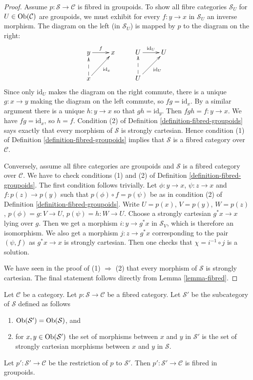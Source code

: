 \begin{proof}
Assume $p : \mathcal{S} \to \mathcal{C}$ is fibred in groupoids.
To show all fibre categories $\mathcal{S}_U$ for
$U \in \mathop{\mathrm{Ob}}\nolimits(\mathcal{C})$
are groupoids, we must exhibit for every $f : y \to x$ in $\mathcal{S}_U$ an
inverse morphism. The diagram on the left (in $\mathcal{S}_U$) is mapped by
$p$ to the diagram on the right:
$$
\xymatrix{
y \ar[r]^f & x & U \ar[r]^{\text{id}_U} & U \\
x \ar@{-->}[u] \ar[ru]_{\text{id}_x} & &
U \ar@{-->}[u]\ar[ru]_{\text{id}_U} & \\
}
$$
Since only $\text{id}_U$ makes the diagram on the right commute, there is a
unique $g : x \to y$ making the diagram on the left commute, so
$fg = \text{id}_x$. By a similar argument there is a unique $h : y \to x$ so
that $gh = \text{id}_y$. Then $fgh = f : y \to x$. We have $fg = \text{id}_x$,
so $h = f$. Condition (2) of Definition \ref{definition-fibred-groupoids} says
exactly that every morphism of $\mathcal{S}$ is strongly cartesian. Hence
condition (1) of Definition \ref{definition-fibred-groupoids} implies that
$\mathcal{S}$ is a fibred category over $\mathcal{C}$.

\medskip\noindent
Conversely, assume all fibre categories are groupoids and
$\mathcal{S}$ is a fibred category over $\mathcal{C}$.
We have to check conditions (1) and (2) of
Definition \ref{definition-fibred-groupoids}.
The first condition follows trivially. Let $\phi : y \to x$,
$\psi : z \to x$ and $f : p(z) \to p(y)$ such that
$p(\phi) \circ f = p(\psi)$ be as in condition (2) of
Definition \ref{definition-fibred-groupoids}.
Write $U = p(x)$, $V = p(y)$, $W = p(z)$, $p(\phi) = g : V \to U$,
$p(\psi) = h : W \to U$. Choose a strongly cartesian $g^*x \to x$
lying over $g$. Then we get a morphism $i : y \to g^*x$ in
$\mathcal{S}_V$, which is therefore an isomorphism. We
also get a morphism $j : z \to g^*x$ corresponding to
the pair $(\psi, f)$ as $g^*x \to x$ is strongly cartesian.
Then one checks that $\chi = i^{-1} \circ j$ is a solution.

\medskip\noindent
We have seen in the proof of (1) $\Rightarrow$ (2) that
every morphism of $\mathcal{S}$ is strongly cartesian.
The final statement follows directly from Lemma \ref{lemma-fibred}.
\end{proof}

\begin{lemma}
\label{lemma-fibred-gives-fibred-groupoids}
Let $\mathcal{C}$ be a category.
Let $p : \mathcal{S} \to \mathcal{C}$ be a fibred category.
Let $\mathcal{S}'$ be the subcategory of $\mathcal{S}$ defined
as follows
\begin{enumerate}
\item $\mathop{\mathrm{Ob}}\nolimits(\mathcal{S}') = \mathop{\mathrm{Ob}}\nolimits(\mathcal{S})$, and
\item for $x, y \in \mathop{\mathrm{Ob}}\nolimits(\mathcal{S}')$ the set of morphisms between $x$
and $y$ in $\mathcal{S}'$ is the set of strongly cartesian morphisms between
$x$ and $y$ in $\mathcal{S}$.
\end{enumerate}
Let $p' : \mathcal{S}' \to \mathcal{C}$ be the restriction of $p$
to $\mathcal{S}'$. Then $p' : \mathcal{S}' \to \mathcal{C}$ is fibred
in groupoids.
\end{lemma}

